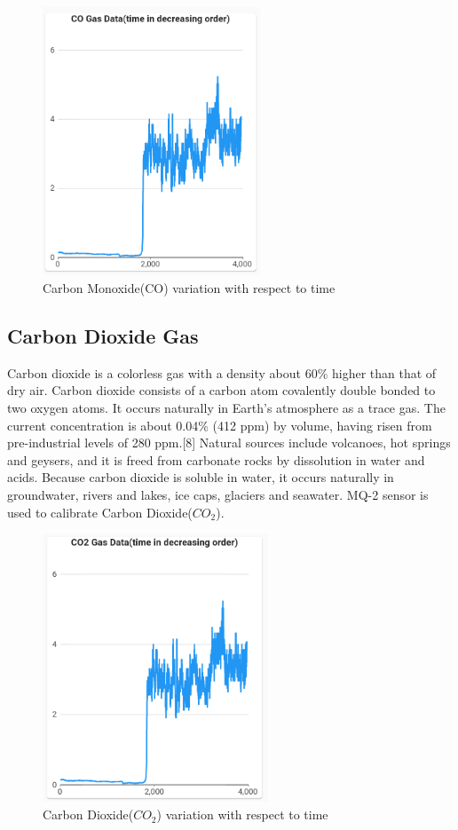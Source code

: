 \begin{figure}[!ht]
\centering
\includegraphics[width=\linewidth,height=8cm]{figures/CO.png}
\caption{\label{img49} Carbon Monoxide(CO) variation with respect to time}
\end{figure}

\subsection{Carbon Dioxide Gas}
Carbon dioxide is a colorless gas with a density about 60\% higher than that of dry air. Carbon dioxide consists of a carbon atom covalently double bonded to two oxygen atoms. It occurs naturally in Earth's atmosphere as a trace gas. The current concentration is about 0.04\% (412 ppm) by volume, having risen from pre-industrial levels of 280 ppm.[8] Natural sources include volcanoes, hot springs and geysers, and it is freed from carbonate rocks by dissolution in water and acids. Because carbon dioxide is soluble in water, it occurs naturally in groundwater, rivers and lakes, ice caps, glaciers and seawater.  MQ-2 sensor is used to calibrate Carbon Dioxide($CO_{2}$).
\begin{figure}[!ht]
\centering
\includegraphics[width=\linewidth,height=8cm]{figures/CO2.png}
\caption{\label{img410} Carbon Dioxide($CO_{2}$) variation with respect to time}
\end{figure}

